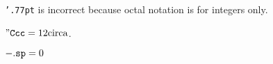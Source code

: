 {\tt '.77pt} is incorrect because octal notation is for integers only.

${\tt "Ccc} = 12 {\rm circa}$.

${\tt -.sp} = 0$

\bye

